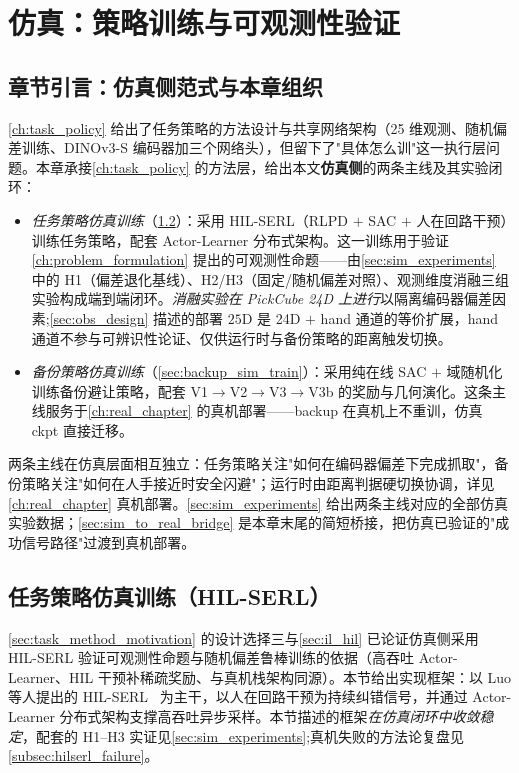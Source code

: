 
\chapter{仿真：策略训练与可观测性验证}\label{ch:sim_chapter}

\section{章节引言：仿真侧范式与本章组织}\label{sec:sim_intro}

\cref{ch:task_policy} 给出了任务策略的方法设计与共享网络架构（25 维观测、随机偏差训练、DINOv3-S 编码器加三个网络头），但留下了"具体怎么训"这一执行层问题。本章承接\cref{ch:task_policy} 的方法层，给出本文\textbf{仿真侧}的两条主线及其实验闭环：

\begin{itemize}
  \item \emph{任务策略仿真训练}（\cref{sec:sim_task_train}）：采用 HIL-SERL（RLPD $+$ SAC $+$ 人在回路干预）训练任务策略，配套 Actor-Learner 分布式架构。这一训练用于验证\cref{ch:problem_formulation} 提出的可观测性命题——由\cref{sec:sim_experiments} 中的 H1（偏差退化基线）、H2/H3（固定/随机偏差对照）、观测维度消融三组实验构成端到端闭环。\emph{消融实验在 PickCube 24D 上进行}以隔离编码器偏差因素;\cref{sec:obs_design} 描述的部署 $25$D 是 24D $+$ hand 通道的等价扩展，hand 通道不参与可辨识性论证、仅供运行时与备份策略的距离触发切换。
  \item \emph{备份策略仿真训练}（\cref{sec:backup_sim_train}）：采用纯在线 SAC $+$ 域随机化训练备份避让策略，配套 V1$\to$V2$\to$V3$\to$V3b 的奖励与几何演化。这条主线服务于\cref{ch:real_chapter} 的真机部署——backup 在真机上不重训，仿真 ckpt 直接迁移。
\end{itemize}

两条主线在仿真层面相互独立：任务策略关注"如何在编码器偏差下完成抓取"，备份策略关注"如何在人手接近时安全闪避"；运行时由距离判据硬切换协调，详见\cref{ch:real_chapter} 真机部署。\cref{sec:sim_experiments} 给出两条主线对应的全部仿真实验数据；\cref{sec:sim_to_real_bridge} 是本章末尾的简短桥接，把仿真已验证的"成功信号路径"过渡到真机部署。

\section{任务策略仿真训练（HIL-SERL）}\label{sec:sim_task_train}

\cref{sec:task_method_motivation} 的设计选择三与\cref{sec:il_hil} 已论证仿真侧采用 HIL-SERL 验证可观测性命题与随机偏差鲁棒训练的依据（高吞吐 Actor-Learner、HIL 干预补稀疏奖励、与真机栈架构同源）。本节给出实现框架：以 Luo 等人提出的 HIL-SERL~\cite{luo2025hilserl} 为主干，以人在回路干预为持续纠错信号，并通过 Actor-Learner 分布式架构支撑高吞吐异步采样。本节描述的框架\emph{在仿真闭环中收敛稳定}，配套的 H1–H3 实证见\cref{sec:sim_experiments};真机失败的方法论复盘见\cref{subsec:hilserl_failure}。

